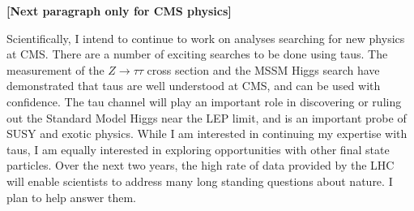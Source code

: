 \documentclass{scrartcl}        %
\begin{document}
\begin{cv}{}
\textbf{[Next paragraph only for CMS physics]}

Scientifically, I intend to continue to work on analyses searching for new
physics at CMS\@.  There are a number of exciting searches to be done 
using taus.  The measurement of the $Z\to\tau\tau$ cross section and the MSSM
Higgs search have demonstrated that taus are well understood at CMS, and can
be used with confidence.  The tau channel will play an important role in
discovering or ruling out the Standard Model Higgs near the LEP limit, and is an
important probe of SUSY and exotic physics. While I am interested in continuing
my expertise with taus, I am equally interested in exploring opportunities with
other final state particles.  Over the next two years, the high rate of data
provided by the LHC will enable scientists to address many long standing
questions about nature. I plan to help answer them. 

\end{cv}
\end{document}
